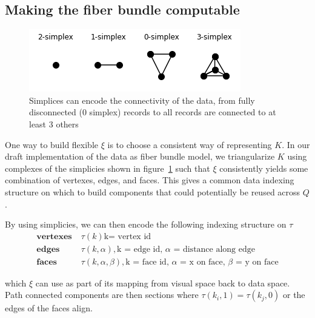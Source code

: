 \documentclass[../main.tex]{subfiles}
\begin{document}
\subsection{Making the fiber bundle computable}
\label{sec:triangulization}

\begin{figure}[H]
    \includegraphics{figures/math/simplex.png}
    \caption{Simplices can encode the connectivity of the data, from fully disconnected (0 simplex) records to all records are connected to at least 3 others}
    \label{fig:triangle_simplex}
\end{figure}

One way to build flexible $\xi$ is to choose a consistent way of representing $K$. In our draft implementation of the data as fiber bundle model, we triangularize $K$ using complexes of the simplicies shown in figure~\ref{fig:triangle_simplex} such that $\xi$ consistently yields some combination of vertexes, edges, and faces. This gives a common data indexing structure on which to build components that could potentially be reused across $Q$.

By using simplicies, we can then encode the following indexing structure on $\tau$
\begin{align*}
    \textbf{vertexes}\;& \tau(k) \text{k= vertex id}\\
    \textbf{edges}\;& \tau(k,\alpha), \text{k = edge id, $\alpha$ = distance along edge} \\
    \textbf{faces}\;& \tau(k,\alpha, \beta), \text{k = face id, $\alpha$ = x on face, $\beta$ = y on face}
\end{align*}

which $\xi$ can use as part of its mapping from visual space back to data space. Path connected components are then sections where $\tau(k_{i},1) = \tau(k_{j},0)$ or the edges of the faces align.  
\end{document}
